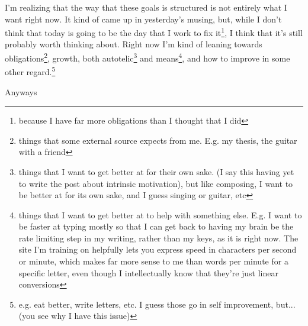\documentclass[12pt]{article}[titlepage]
\renewcommand{\,}{\textsuperscript{,}}
\begin{document}
I'm realizing that the way that these goals is structured is not entirely what I want right now.  
It kind of came up in yesterday's musing, but, while I don't think that today is going to be the day that I work to fix it\footnote{because I have far more obligations than I thought that I did}, I think that it's still probably worth thinking about.  
Right now I'm kind of leaning towards obligations\footnote{things that some external source expects from me. E.g. my thesis, the guitar with a friend}, growth, both autotelic\footnote{things that I want to get better at for their own sake. (I say this having yet to write the post about intrinsic motivation), but like composing, I want to be better at for its own sake, and I guess singing or guitar, etc} and means\footnote{things that I want to get better at to help with something else. E.g. I want to be faster at typing mostly so that I can get back to having my brain be the rate limiting step in my writing, rather than my keys, as it is right now. The site I'm training on helpfully lets you express speed in characters per second or minute, which makes far more sense to me than words per minute for a specific letter, even though I intellectually know that they're just linear conversions}, and how to improve in some other regard.\footnote{e.g. eat better, write letters, etc. I guess those go in self improvement, but... (you see why I have this issue)}

Anyways
\end{document}
